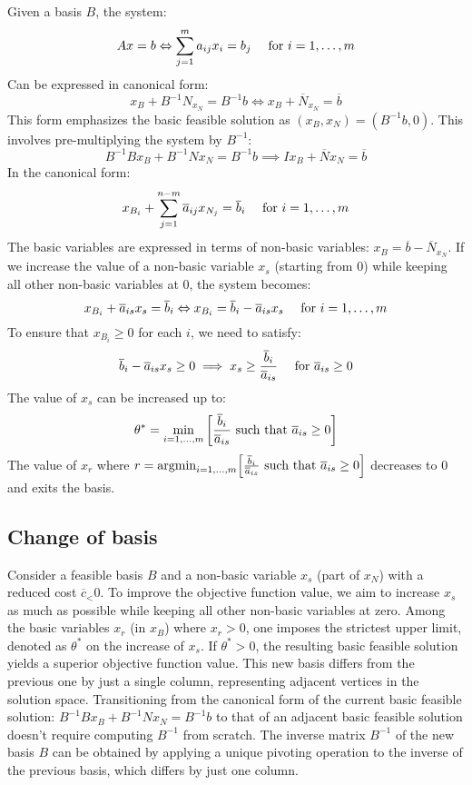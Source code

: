 Given a basis $B$, the system:
\[Ax=b \Leftrightarrow \sum_{j=1}^{m}a_{ij}x_i=b_j \:\:\:\:\:\: \textnormal{for }i=1,\dots,m\]
Can be expressed in canonical form: 
\[x_B+B^{-1}N_{x_N}=B^{-1}b \Leftrightarrow x_B+\overline{N}_{x_N}=\overline{b}\]
This form emphasizes the basic feasible solution as $(x_B,x_N)=(B^{-1}b,0)$. 
This involves pre-multiplying the system by $B^{-1}$: 
\[B^{-1}Bx_B+B^{-1}Nx_N=B^{-1}b \implies Ix_B+\overline{N}x_N=\overline{b}\]
In the canonical form: 
\[x_{B_i}+\sum_{j=1}^{n-m}\overline{a}_{ij}x_{N_j}=\overline{b}_i \:\:\:\:\:\: \textnormal{for }i=1,\dots,m\]
The basic variables are expressed in terms of non-basic variables: $x_B=\overline{b}-\overline{N}_{x_N}$. 
If we increase the value of a non-basic variable $x_s$ (starting from 0) while keeping all other non-basic variables at 0, the system becomes: 
\[x_{B_i}+\overline{a}_{is}x_s=\overline{b}_i \Leftrightarrow x_{B_i}=\overline{b}_i-\overline{a}_{is}x_s \:\:\:\:\:\: \textnormal{for }i=1,\dots,m\]
To ensure that $x_{B_i} \geq 0$ for each $i$, we need to satisfy: 
\[\overline{b}_i-\overline{a}_{is}x_s \geq 0 \implies x_s \geq \dfrac{\overline{b}_i}{\overline{a}_{is}} \:\:\:\:\:\: \textnormal{for }\overline{a}_{is} \geq 0\]
The value of $x_s$ can be increased up to: 
\[\theta^{*}=\min_{i=1,\dots,m}{\left[\dfrac{\overline{b}_i}{\overline{a}_{is}} \textnormal{ such that }\overline{a}_{is} \geq 0\right]}\]
The value of $x_r$ where $r=\textnormal{argmin}_{i=1,\dots,m}{\left[\frac{\overline{b}_i}{\overline{a}_{is}} \textnormal{ such that }\overline{a}_{is} \geq 0\right]}$ decreases to 0 and exits the basis. 

\subsection*{Change of basis}
Consider a feasible basis $B$ and a non-basic variable $x_s$ (part of $x_N$) with a reduced cost $\overline{c}_ < 0$.
To improve the objective function value, we aim to increase $x_s$ as much as possible while keeping all other non-basic variables at zero.
Among the basic variables $x_r$ (in $x_B$) where $x_r>0$, one imposes the strictest upper limit, denoted as $\theta^{*}$ on the increase of $x_s$.
If $\theta^{*} > 0$, the resulting basic feasible solution yields a superior objective function value.
This new basis differs from the previous one by just a single column, representing adjacent vertices in the solution space.
Transitioning from the canonical form of the current basic feasible solution:
$B^{-1}Bx_B+B^{-1}Nx_N=B^{-1}b$
to that of an adjacent basic feasible solution doesn't require computing $B^{-1}$ from scratch.
The inverse matrix $B^{-1}$ of the new basis $B$ can be obtained by applying a unique pivoting operation to the inverse of the previous basis, which differs by just one column.

